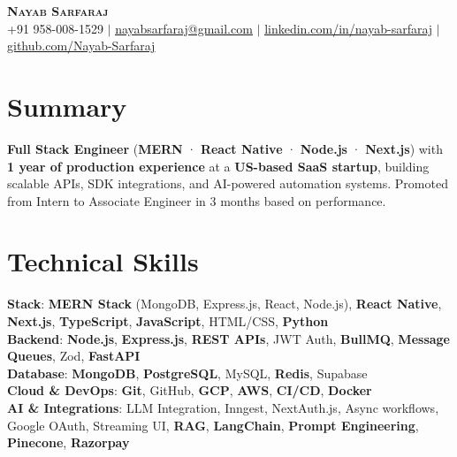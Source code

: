 \documentclass[letterpaper,11pt]{article}
\newcommand{\resumeItem}[1]{
  \item\small{
    {#1 \vspace{-2pt}}
  }
}
\newcommand{\resumeItemListStart}{\begin{itemize}}
\newcommand{\resumeItemListEnd}{\end{itemize}\vspace{-5pt}}
\begin{document}


\begin{center}
    \textbf{\Huge \scshape Nayab Sarfaraj} \\ \vspace{1pt}
    \small +91 958-008-1529 $|$ \href{nayabsarfaraj@gmail.com}{\underline{nayabsarfaraj@gmail.com}} $|$ 
    \href{https://www.linkedin.com/in/nayab-sarfaraj-856a70258/}{\underline{linkedin.com/in/nayab-sarfaraj}} $|$
    \href{https://github.com/Nayab-Sarfaraj}{\underline{github.com/Nayab-Sarfaraj}}
\end{center}



\section{Summary}
\resumeItem{\textbf{Full Stack Engineer} (\textbf{MERN} · \textbf{React Native} · \textbf{Node.js} · \textbf{Next.js}) with \textbf{1 year of production experience} at a \textbf{US-based SaaS startup}, building scalable APIs, SDK integrations, and AI-powered automation systems. Promoted from Intern to Associate Engineer in 3 months based on performance.
}
\section{Technical Skills}
 \begin{itemize}[leftmargin=0.15in, label={}]
    \small{\item{
     \textbf{Stack}{: \textbf{MERN Stack} (MongoDB, Express.js, React, Node.js), \textbf{React Native}, \textbf{Next.js}, \textbf{TypeScript}, \textbf{JavaScript}, HTML/CSS, \textbf{Python}} \\
     \textbf{Backend}{: \textbf{Node.js}, \textbf{Express.js}, \textbf{REST APIs}, JWT Auth, \textbf{BullMQ}, \textbf{Message Queues}, Zod, \textbf{FastAPI}} \\
     \textbf{Database}{: \textbf{MongoDB}, \textbf{PostgreSQL}, MySQL, \textbf{Redis}, Supabase}\\
     \textbf{Cloud \& DevOps}{: \textbf{Git}, GitHub, \textbf{GCP}, \textbf{AWS}, \textbf{CI/CD}, \textbf{Docker}}\\
     \textbf{AI \& Integrations}{: LLM Integration, Inngest, NextAuth.js, Async workflows, Google OAuth, Streaming UI, \textbf{RAG}, \textbf{LangChain}, \textbf{Prompt Engineering}, \textbf{Pinecone}, \textbf{Razorpay}}
    }}
 \end{itemize}
\end{document}
